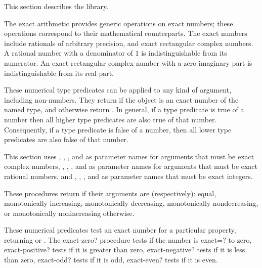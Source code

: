This section describes the  library.

The exact arithmetic provides generic operations on exact numbers;
these operations correspond to their mathematical counterparts.  The
exact numbers include rationals of arbitrary precision, and exact
rectangular complex numbers.  A rational number with a denominator of
$1$ is indistinguishable from its numerator.  An exact rectangular
complex number with a zero imaginary part is indistinguishable from
its real part.

\begin{entry}{%
}

These numerical type predicates can be applied to any kind of
argument, including non-numbers.  They return \schtrue{} if the object
is an exact number of the named type, and otherwise return
\schfalse{}.  In general, if a type predicate is true of a number then
all higher type predicates are also true of that number.
Consequently, if a type predicate is false of a number, then all lower
type predicates are also false of that number.
\end{entry}

This section uses , , , and  as
parameter names for arguments that must be exact complex numbers, ,
, , and  as parameter names for arguments 
that must be exact rational numbers, and , , , and
 as parameter names that must be exact integers.

\begin{entry}{%
}

These procedures return \schtrue{} if their arguments are
(respectively): equal, monotonically increasing, monotonically
decreasing, monotonically nondecreasing, or monotonically
nonincreasing \schfalse{} otherwise.
\end{entry}

\begin{entry}{%
}

These numerical predicates test an exact number for a particular
property, returning \schtrue{} or \schfalse{}.  The {\cf exact-zero?} procedure
tests if the number is {\cf exact=?} to zero, {\cf exact-positive?}
tests if it is greater than zero, {\cf exact-negative?} tests if it is
less than zero, {\cf exact-odd?} tests if it is odd, {\cf exact-even?}
tests if it is even.
\end{entry}

